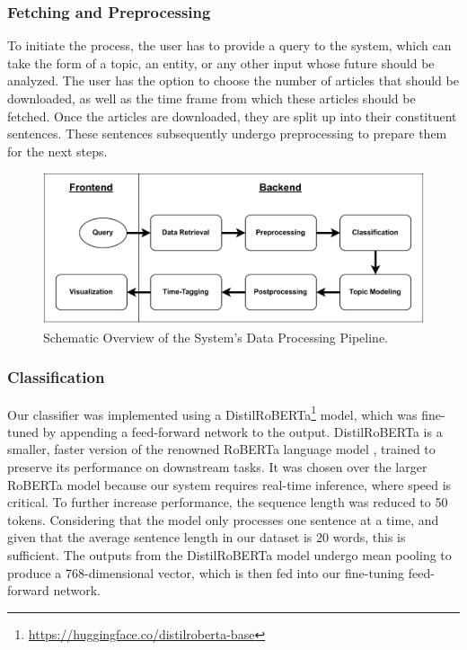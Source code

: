 \documentclass[sigconf]{acmart}
\begin{document}
\subsubsection{Fetching and Preprocessing}
To initiate the process, the user has to provide a query to the system, which can take the form of a topic, an entity, or any other input whose future should be analyzed. The user has the option to choose the number of articles that should be downloaded, as well as the time frame from which these articles should be fetched. Once the articles are downloaded, they are split up into their constituent sentences. These sentences subsequently undergo preprocessing to prepare them for the next steps.

\begin{figure}[H]
\centering
\includegraphics[width=\linewidth]{img/system.pdf}
\caption{Schematic Overview of the System's Data Processing Pipeline.}
\label{fig:archi}
\end{figure}

\subsubsection{Classification}
Our classifier was implemented using a DistilRoBERTa\footnote{\url{https://huggingface.co/distilroberta-base}} model, which was fine-tuned by appending a feed-forward network to the output. DistilRoBERTa is a smaller, faster version of the renowned RoBERTa language model \cite{roberta}, trained to preserve its performance on downstream tasks. It was chosen over the larger RoBERTa model because our system requires real-time inference, where speed is critical. To further increase performance, the sequence length was reduced to 50 tokens. Considering that the model only processes one sentence at a time, and given that the average sentence length in our dataset is 20 words, this is sufficient.
The outputs from the DistilRoBERTa model undergo mean pooling to produce a 768-dimensional vector, which is then fed into our fine-tuning feed-forward network.
\end{document}
